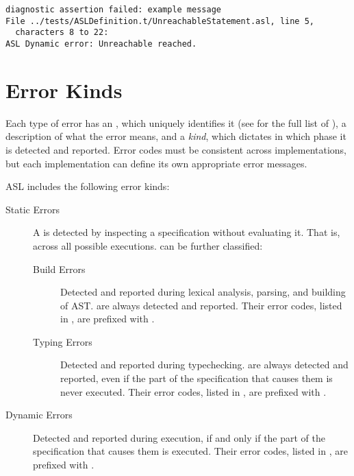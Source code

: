 \begin{Verbatim}[fontsize=\footnotesize, frame=single]
diagnostic assertion failed: example message
File ../tests/ASLDefinition.t/UnreachableStatement.asl, line 5,
  characters 8 to 22:
ASL Dynamic error: Unreachable reached.
\end{Verbatim}

\section{Error Kinds}
\hypertarget{def-errorcodeterm}{}
Each type of error has an \emph{\errorcodeterm}, which uniquely identifies it
(see  for the full list of \errorcodesterm),
a description of what the error means,
and a \emph{kind}, which dictates in which phase it is detected and reported.
Error codes must be consistent across implementations, but each implementation
can define its own appropriate error messages.

ASL includes the following error kinds:
\begin{description}
  \item[Static Errors] \hypertarget{def-staticerrorterm}{}
  A \emph{\staticerrorterm} is detected by inspecting a specification without evaluating it.
  That is, across all possible executions. \staticerrorsterm{} can be further classified:
  \begin{description}
    \item[Build Errors] \hypertarget{def-builderrorterm}{}
      Detected and reported during lexical analysis, parsing, and building of AST.
      \Builderrorsterm{} are always detected and reported.
      Their error codes, listed in , are prefixed with \BuildErrorPrefix.

    \item[Typing Errors] \hypertarget{def-typingerrorterm}{}
      Detected and reported during typechecking.
      \Typingerrorsterm{} are always detected and reported, even if the part of the specification that causes them is never executed.
      Their error codes, listed in , are prefixed with \TypeErrorPrefix.
  \end{description}

  \item[Dynamic Errors] \hypertarget{def-dynamicerrorterm}{}
    Detected and reported during execution, if and only if the part of the specification that causes them is executed.
    Their error codes, listed in , are prefixed with \DynamicErrorPrefix.
\end{description}

